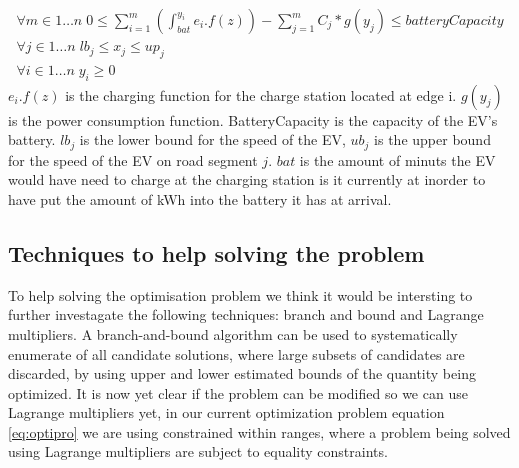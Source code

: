 \begin{gather}
\forall{m \in 1 \dots n} \; 0 \leq \sum_{i=1}^{m} \left( \int_{bat}^{y_i} e_i.f(z) \right) - \sum_{j=1}^{m} C_j*g(y_j) \leq batteryCapacity \\
\forall{j \in 1 \dots n} \; lb_j \leq x_j \leq up_j \\
\forall{i \in 1 \dots n} \; y_i \geq 0
\end{gather}\label{eq:pathconstration}
$e_i.f(z)$ is the charging function for the charge station located at edge i. $g(y_j)$ is the power consumption function. BatteryCapacity is the capacity of the EV's battery. 
$lb_j$ is the lower bound for the speed of the EV, $ub_j$ is the upper bound for the speed of the EV on road segment $j$. $bat$ is the amount of minuts the EV would have need to charge at the charging station is it currently at inorder to have put the amount of kWh into the battery it has at arrival. 


\subsection{Techniques to help solving the problem}
To help solving the optimisation problem we think it would be intersting to further investagate the following techniques: branch and bound and Lagrange multipliers.
A branch-and-bound algorithm can be used to systematically enumerate  of all candidate solutions, where large subsets of candidates are discarded, by using upper and lower estimated bounds of the quantity being optimized. 
It is now yet clear if the problem can be modified so we can use Lagrange multipliers yet, in our current optimization problem equation \ref{eq:optipro} we are using constrained within ranges, where a problem being solved using Lagrange multipliers are subject to equality constraints.


